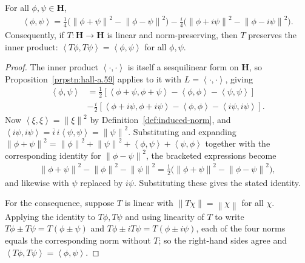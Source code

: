 \begin{proposition}
    \label{prpstn:polarization-identity}
    \leanok
    For all $\phi,\psi \in \mathbf{H}$,
    \begin{align}
        \left< \phi, \psi \right> = \frac{1}{4}\Big( \left\| \phi+\psi \right\|^2 - \left\| \phi-\psi \right\|^2 \Big) - \frac{i}{4}\Big( \left\| \phi+i\psi \right\|^2 - \left\| \phi-i\psi \right\|^2 \Big).
    \end{align}
    Consequently, if $T : \mathbf{H} \to \mathbf{H}$ is linear and norm-preserving, then $T$ preserves the inner product: $\left< T\phi, T\psi \right> = \left< \phi,\psi \right>$ for all $\phi,\psi$.
\end{proposition}
\begin{proof}
    \leanok
The inner product $\left< \cdot, \cdot \right>$ is itself a sesquilinear form on $\mathbf{H}$, so Proposition~\ref{prpstn:hall-a.59} applies to it with $L = \left< \cdot, \cdot \right>$, giving
\begin{align}
    \left< \phi, \psi \right> &= \frac{1}{2} \left[ \left< \phi+\psi, \phi+\psi \right> - \left< \phi,\phi \right> - \left< \psi,\psi \right> \right] \\
                              &-\frac{i}{2} \left[ \left< \phi+i\psi, \phi+i\psi \right> - \left< \phi,\phi \right> - \left< i\psi, i\psi \right> \right].
\end{align}
Now $\left< \xi,\xi \right> = \left\| \xi \right\|^2$ by Definition~\ref{def:induced-norm}, and $\left< i\psi, i\psi \right> = \overline{i}\,i \left< \psi,\psi \right> = \left\| \psi \right\|^2$. Substituting and expanding $\left\| \phi+\psi \right\|^2 = \left\| \phi \right\|^2 + \left\| \psi \right\|^2 + \left< \phi,\psi \right> + \left< \psi,\phi \right>$ together with the corresponding identity for $\left\| \phi - \psi \right\|^2$, the bracketed expressions become
\begin{align}
    \left\| \phi+\psi \right\|^2 - \left\| \phi \right\|^2 - \left\| \psi \right\|^2 = \tfrac{1}{2}\Big( \left\| \phi+\psi \right\|^2 - \left\| \phi-\psi \right\|^2 \Big),
\end{align}
and likewise with $\psi$ replaced by $i\psi$. Substituting these gives the stated identity.

For the consequence, suppose $T$ is linear with $\left\| T\chi \right\| = \left\| \chi \right\|$ for all $\chi$. Applying the identity to $T\phi, T\psi$ and using linearity of $T$ to write $T\phi \pm T\psi = T(\phi\pm\psi)$ and $T\phi \pm iT\psi = T(\phi\pm i\psi)$, each of the four norms equals the corresponding norm without $T$; so the right-hand sides agree and $\left< T\phi,T\psi \right> = \left< \phi,\psi \right>$.
\end{proof}

